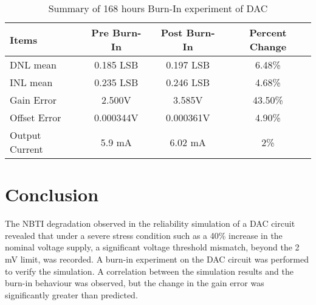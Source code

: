 \documentclass[11pt,a4paper]{article}
\begin{document}
\begin{table}[t]
\centering
\caption{Summary of 168 hours Burn-In experiment of DAC}
\label{table3}
\begin{tabular}{|l|c|c|c|}\hline
Items&Pre Burn-In&Post Burn-In&Percent Change\\
\hline
DNL mean&0.185 LSB&0.197 LSB&6.48\%\\
INL mean&0.235 LSB&0.246 LSB&4.68\%\\
Gain Error&2.500V&3.585V&43.50\%\\
Offset Error&0.000344V&0.000361V&4.90\%\\
Output Current&5.9 mA&6.02 mA&2\%\\
\hline
\end{tabular}

\end{table}

\section{Conclusion}
The NBTI degradation observed in the reliability simulation of a DAC circuit revealed that under a severe stress condition such as a 40\% increase in the nominal voltage supply, a significant voltage threshold mismatch, beyond the 2 mV limit, was recorded. A burn-in experiment on the DAC circuit was performed to verify the simulation. A correlation between the simulation results and the burn-in behaviour was observed, but the change in the gain error was significantly greater than predicted. 
\end{document}
